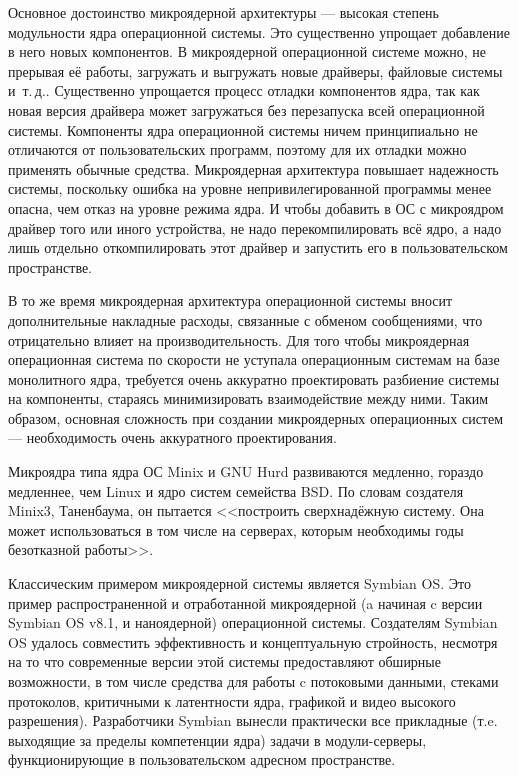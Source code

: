 Основное достоинство микроядерной архитектуры --- высокая степень модульности ядра операционной системы. Это существенно упрощает добавление в него новых компонентов. В микроядерной операционной системе можно, не прерывая её работы, загружать и выгружать новые драйверы, файловые системы и~т.\,д.. Существенно упрощается процесс отладки компонентов ядра, так как новая версия драйвера может загружаться без перезапуска всей операционной системы.
Компоненты ядра операционной системы ничем принципиально не отличаются от пользовательских программ, поэтому для их отладки можно применять обычные средства. Микроядерная архитектура повышает надежность системы, поскольку ошибка на уровне непривилегированной программы менее опасна, чем отказ на уровне режима ядра. И чтобы добавить в ОС с микроядром драйвер того или иного устройства, не надо перекомпилировать всё ядро, а надо лишь отдельно откомпилировать этот драйвер и запустить его в пользовательском пространстве.

В то же время микроядерная архитектура операционной системы вносит дополнительные накладные расходы, связанные с обменом сообщениями, что отрицательно влияет на производительность. Для того чтобы микроядерная операционная система по скорости не уступала операционным системам на базе монолитного ядра, требуется очень аккуратно проектировать разбиение системы на компоненты, стараясь минимизировать взаимодействие между ними. Таким образом, основная сложность при создании микроядерных операционных систем --- необходимость очень аккуратного проектирования.

Микроядра типа ядра ОС Minix и GNU Hurd развиваются медленно, гораздо медленнее, чем Linux и ядро систем семейства BSD. По словам создателя Minix3, Таненбаума, он пытается <<построить сверхнадёжную систему. Она может использоваться в том числе на серверах, которым необходимы годы безотказной работы>>.

Классическим примером микроядерной системы является Symbian OS. Это пример распространенной и отработанной микроядерной (a начиная c версии Symbian OS v8.1, и наноядерной) операционной системы. Создателям Symbian OS удалось совместить эффективность и концептуальную стройность, несмотря на то что современные версии этой системы предоставляют обширные возможности, в том числе средства для работы c потоковыми данными, стеками протоколов, критичными к латентности ядра, графикой и видео высокого разрешения).
Разработчики Symbian вынесли практически все прикладные (т.e. выходящие за пределы компетенции ядра) задачи в модули-серверы, функционирующие в пользовательском адресном пространстве.

